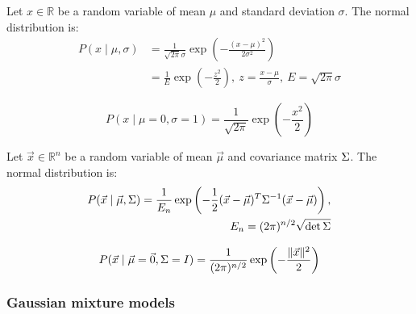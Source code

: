 \begin{dfn}
  \label{dfn:9:univariate-normal-distribution}
  Let $x \in \mathbb{R}$ be a random variable of mean $\mu$ and standard
  deviation $\sigma$.
  The normal distribution is:
  \begin{align}
    P(x \mid \mu, \sigma)
     & = \frac{1}{\sqrt{2 \pi} \sigma} \exp \left( - \frac{(x - \mu)^2}{2 \sigma^2} \right)
    \\
     & = \frac{1}{E} \exp \left( - \frac{z^2}{2} \right) ,\
    z = \frac{x - \mu}{\sigma} ,\
    E = \sqrt{2 \pi} \sigma
  \end{align}
\end{dfn}

\begin{dfn}
  \begin{equation}
    P(x \mid \mu = 0, \sigma = 1)
    = \frac{1}{\sqrt{2 \pi}} \exp \left( - \frac{x^2}{2} \right)
  \end{equation}
\end{dfn}

\begin{dfn}
  \label{dfn:9:multivariate-normal-distribution}
  Let $\vec{x} \in \mathbb{R}^n$ be a random variable of mean $\vec{\mu}$ and
  covariance matrix $\Sigma$.
  The normal distribution is:
  \begin{equation}
    \begin{split}
      P(\vec{x} \mid \vec{\mu}, \Sigma)
      = \frac{1}{E_n} \exp \left(
      - \frac{1}{2} (\vec{x} - \vec{\mu})^T \Sigma^{-1} (\vec{x} - \vec{\mu})
      \right) ,
      \\
      E_n = (2 \pi)^{n/2} \sqrt{\det \Sigma}
    \end{split}
  \end{equation}
\end{dfn}

\begin{dfn}
  \begin{equation}
    P(\vec{x} \mid \vec{\mu} = \vec{0}, \Sigma = I)
    = \frac{1}{(2 \pi)^{n / 2}} \exp \left( - \frac{\lVert \vec{x} \rVert^2}{2} \right)
  \end{equation}
\end{dfn}

\subsubsection{Gaussian mixture models}

